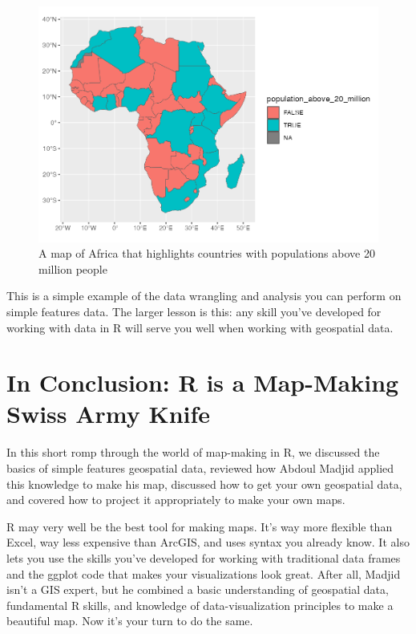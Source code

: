 \documentclass[
]{book}
\begin{document}
\begin{figure}
\includegraphics[width=1\linewidth]{maps_files/figure-latex/africa-map-20m-1} \caption{A map of Africa that highlights countries with populations above 20 million people}\label{fig:africa-map-20m}
\end{figure}

This is a simple example of the data wrangling and analysis you can perform on simple features data. The larger lesson is this: any skill you've developed for working with data in R will serve you well when working with geospatial data.

\hypertarget{in-conclusion-r-is-a-map-making-swiss-army-knife}{%
\section*{In Conclusion: R is a Map-Making Swiss Army Knife}\label{in-conclusion-r-is-a-map-making-swiss-army-knife}}

In this short romp through the world of map-making in R, we discussed the basics of simple features geospatial data, reviewed how Abdoul Madjid applied this knowledge to make his map, discussed how to get your own geospatial data, and covered how to project it appropriately to make your own maps.

R may very well be the best tool for making maps. It's way more flexible than Excel, way less expensive than ArcGIS, and uses syntax you already know. It also lets you use the skills you've developed for working with traditional data frames and the ggplot code that makes your visualizations look great. After all, Madjid isn't a GIS expert, but he combined a basic understanding of geospatial data, fundamental R skills, and knowledge of data-visualization principles to make a beautiful map. Now it's your turn to do the same.
\end{document}
